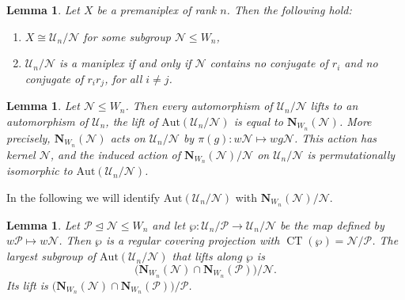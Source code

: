 \documentclass{amsart}
\newcommand{\marusa}[1]{\todo[color=red!25]{\textbf{Maru\v{s}a:} #1}}
\theoremstyle{plain}
\newtheorem{lemma}[theorem]{Lemma}
\theoremstyle{definition}
\theoremstyle{remark}
\newcommand{\U}{\mathcal U}
\renewcommand{\P}{\mathcal P}
\newcommand{\N}{\mathcal N}
\newcommand{\No}{\mathbf N}
\newcommand{\Aut}{\mathrm{Aut}}
\DeclareMathOperator{\CT}{CT}
\begin{document}
\begin{lemma}\label{lem:quotient}
	Let $X$ be a premaniplex of rank $n$. Then the following hold:
	\begin{enumerate}
		\item $X\cong\U_n/\N$ for some subgroup $\N\le W_n$,
		\item $\U_n/\N$ is a maniplex if and only if $\N$ contains no
			conjugate of $r_i$ and no conjugate of $r_ir_j$, for all $i\ne j$.
	\end{enumerate}
\end{lemma}


\begin{lemma}\label{lem:aut}
	Let $\N\le W_n$. Then every automorphism of $\U_n/\N$ lifts to an automorphism of $\U_n$, 
  the lift of $\Aut(\U_n/\N)$ is equal to $\No_{W_n}(\N)$. More precisely,
    $\No_{W_n}(\N)$ acts on $\U_n/\N$ by $\pi(g): w\N\mapsto wg\N$. 
    This action has kernel $\N$, and the induced action of  $\No_{W_n}(\N)/\N$ on
     $\U_n/\N$ is permutationally isomorphic to
    $\Aut(\U_n/\N)$.
\end{lemma}

In the following we will identify $\Aut(\U_n/\N)$ with $\No_{W_n}(\N)/\N$.

\begin{lemma}\label{lem:cover}
	Let $\P\trianglelefteq\N\le W_n$ and let
	$\wp:\U_n/\P\rightarrow\U_n/\N$ be the map defined by $w\P\mapsto w\N$. Then
	$\wp$ is a regular covering projection with $\CT(\wp)=\N/\P$.
	The largest subgroup of $\Aut(\U_n/\N)$ that lifts along $\wp$ is
			\[
				\bigl(\No_{W_n}(\N)\cap\No_{W_n}(\P)\bigr)/\N.
			\]
	Its lift is $\bigl(\No_{W_n}(\N)\cap\No_{W_n}(\P)\bigr)/\P$.
	\end{lemma}
 
\end{document}
